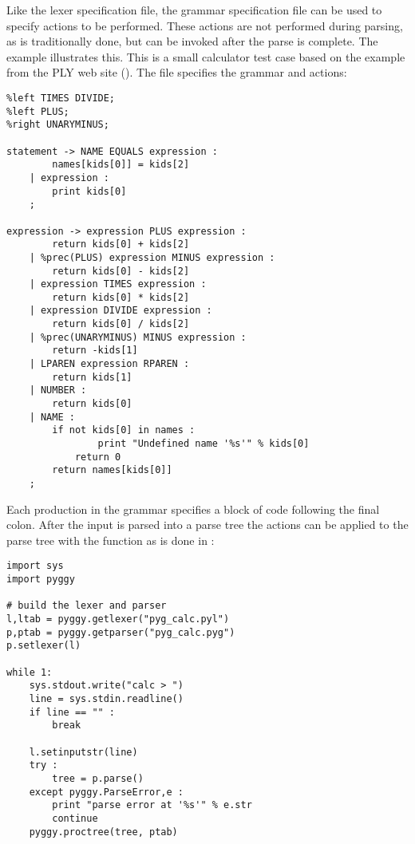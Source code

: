 Like the lexer specification file, the grammar specification file can
be used to specify actions to be performed.  These actions are not performed
during parsing, as is traditionally done, but can be invoked after the
parse is complete.  The  example illustrates
this.  This is a small calculator test case based on the example
from the PLY web site 
().
The 
file specifies the grammar and actions:

\begin{verbatim}
%left TIMES DIVIDE;
%left PLUS;
%right UNARYMINUS;

statement -> NAME EQUALS expression :
        names[kids[0]] = kids[2]
    | expression :
        print kids[0]
    ;

expression -> expression PLUS expression :
        return kids[0] + kids[2]
    | %prec(PLUS) expression MINUS expression :
        return kids[0] - kids[2]
    | expression TIMES expression :
        return kids[0] * kids[2]
    | expression DIVIDE expression :
        return kids[0] / kids[2]
    | %prec(UNARYMINUS) MINUS expression :
        return -kids[1]
    | LPAREN expression RPAREN :
        return kids[1]
    | NUMBER :
        return kids[0]
    | NAME :
        if not kids[0] in names :
                print "Undefined name '%s'" % kids[0]
            return 0
        return names[kids[0]]
    ;
\end{verbatim}

Each production in the grammar specifies a block of code following
the final colon.  After the input is parsed into a parse tree
the actions can be applied to the parse tree with the 
function as is done in :

\begin{verbatim}
import sys
import pyggy

# build the lexer and parser
l,ltab = pyggy.getlexer("pyg_calc.pyl")
p,ptab = pyggy.getparser("pyg_calc.pyg")
p.setlexer(l)

while 1:
    sys.stdout.write("calc > ")
    line = sys.stdin.readline()
    if line == "" :
        break

    l.setinputstr(line)
    try :
        tree = p.parse()
    except pyggy.ParseError,e :
        print "parse error at '%s'" % e.str
        continue
    pyggy.proctree(tree, ptab)
\end{verbatim}

